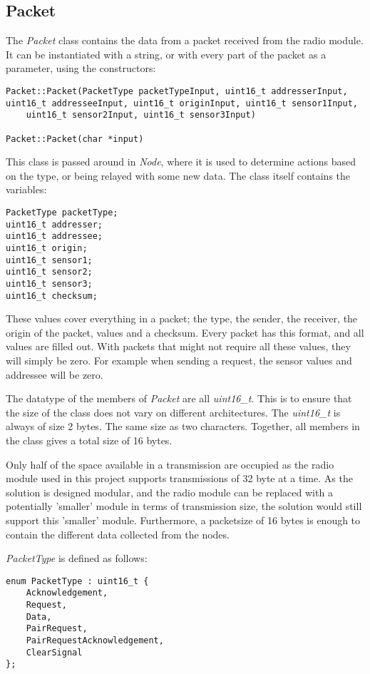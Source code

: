 \subsection{Packet}
The \textit{Packet} class contains the data from a packet received from the radio module. It can be instantiated with a string, or with every part of the packet as a parameter, using the constructors:
\begin{lstlisting}
Packet::Packet(PacketType packetTypeInput, uint16_t addresserInput, uint16_t addresseeInput, uint16_t originInput, uint16_t sensor1Input,
	uint16_t sensor2Input, uint16_t sensor3Input)
	
Packet::Packet(char *input)
\end{lstlisting}


This class is passed around in \textit{Node}, where it is used to determine actions based on the type, or being relayed with some new data. 
The class itself contains the variables:
\begin{lstlisting}
PacketType packetType;
uint16_t addresser;
uint16_t addressee;
uint16_t origin;
uint16_t sensor1;
uint16_t sensor2;
uint16_t sensor3;
uint16_t checksum;
\end{lstlisting}
These values cover everything in a packet; the type, the sender, the receiver, the origin of the packet, values and a checksum.
Every packet has this format, and all values are filled out. With packets that might not require all these values, they will simply be zero. For example when sending a request, the sensor values and addressee will be zero.

The datatype of the members of \textit{Packet} are all \textit{uint16\_t}. This is to ensure that the size of the class does not vary on different architectures. The \textit{uint16\_t} is always of size 2 bytes. The same size as two characters. Together, all members in the class gives a total size of 16 bytes. 

Only half of the space available in a transmission are occupied as the radio module used in this project supports transmissions of 32 byte at a time. As the solution is designed modular, and the radio module can be replaced with a potentially 'smaller' module in terms of transmission size, the solution would still support this 'smaller' module. Furthermore, a packetsize of 16 bytes is enough to contain the different data collected from the nodes.

\textit{PacketType} is defined as follows:
\begin{lstlisting}
enum PacketType : uint16_t {
    Acknowledgement,
    Request,
    Data,
    PairRequest,
    PairRequestAcknowledgement,
    ClearSignal
};
\end{lstlisting}


